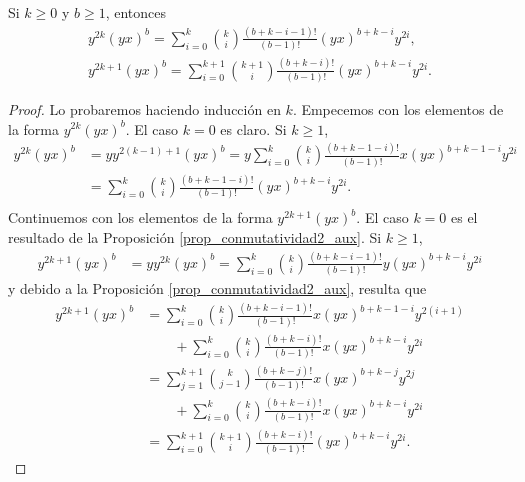 \documentclass[fleqn,../tesis.tex]{subfiles}
\begin{document}
\begin{prop}
\label{prop_conmutatividad2}
Si $k \geq 0$ y $b \geq 1$, entonces
\begin{align*}
    y^{2k}(yx)^b = \sum_{i = 0}^{k}\binom{k}{i} \frac{(b + k - i - 1)!}{(b - 1)!} (yx)^{b + k - i}y^{2i},\\
    y^{2k + 1}(yx)^{b} = \sum_{i = 0}^{k + 1}\binom{k + 1}{i}\frac{(b + k - i)!}{(b - 1)!}(yx)^{b + k - i}y^{2i}.
\end{align*}
\end{prop}
\begin{proof}
    Lo probaremos haciendo inducción en $k$. Empecemos con los elementos de la forma $y^{2k}(yx)^b$. El caso $k = 0$
    es claro. Si $k \geq 1$,
    \begin{align*}
        y^{2k}(yx)^{b} &= y y^{2(k - 1) + 1}(yx)^b = y \sum_{i = 0}^{k}\binom{k}{i}\frac{(b + k  -1 - i)!}{(b - 1)!}x(yx)^{b + k - 1 - i}y^{2i}\\
        &= \sum_{i = 0}^{k}\binom{k}{i}\frac{(b + k  -1 - i)!}{(b - 1)!}(yx)^{b + k - i}y^{2i}.\\
    \end{align*}
    Continuemos con los elementos de la forma $y^{2k + 1}(yx)^{b}$.
    El caso $k = 0$ es el resultado de la Proposición \ref{prop_conmutatividad2_aux}. Si $k \geq 1$,
    \begin{align*}
        y^{2k + 1}(yx)^b &= yy^{2k}(yx)^b =  \sum_{i = 0}^{k}\binom{k}{i} \frac{(b + k - i - 1)!}{(b - 1)!} y (yx)^{b + k - i}y^{2i}
    \end{align*}
    y debido a la Proposición \ref{prop_conmutatividad2_aux}, resulta que
    \begin{align*}
        y^{2k + 1}(yx)^b &= \sum_{i = 0}^{k}\binom{k}{i} \frac{(b + k - i - 1)!}{(b - 1)!} x (yx)^{b + k -1 - i}y^{2(i + 1)}\\
            &\qquad + \sum_{i = 0}^{k}\binom{k}{i} \frac{(b + k - i)!}{(b - 1)!} x (yx)^{b + k - i}y^{2i}\\
        &= \sum_{j = 1}^{k + 1}\binom{k}{j - 1} \frac{(b + k - j)!}{(b - 1)!} x (yx)^{b + k - j}y^{2j}\\
            &\qquad + \sum_{i = 0}^{k}\binom{k}{i} \frac{(b + k - i)!}{(b - 1)!} x (yx)^{b + k - i}y^{2i}\\
        &= \sum_{i = 0}^{k + 1}\binom{k + 1}{i}\frac{(b + k - i)!}{(b - 1)!}(yx)^{b + k - i}y^{2i}.
    \end{align*}     
\end{proof}
\end{document}
